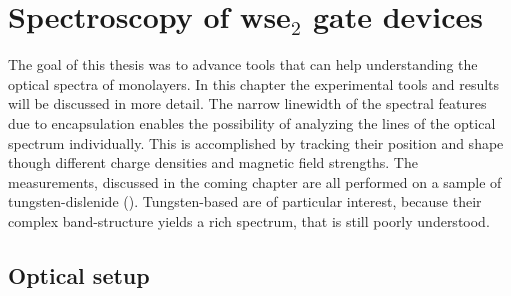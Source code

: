\chapter{Spectroscopy of ws\textup{e}$_2$ gate devices}\label{spectroscopy}

The goal of this thesis was to advance tools that can help understanding the optical spectra of \tmdg monolayers. In this chapter the experimental tools and results will be discussed in more detail. The narrow linewidth of the spectral features due to \hbng encapsulation enables the possibility of analyzing the lines of the optical spectrum individually. This is accomplished by tracking their position and shape though different charge densities and magnetic field strengths. The measurements, discussed in the coming chapter are all performed on a sample of tungsten-dislenide (\wse\!). Tungsten-based \tmds are of particular interest, because their complex band-structure yields a rich spectrum, that is still poorly understood.

\section{Optical setup}\label{opticalsetup}

